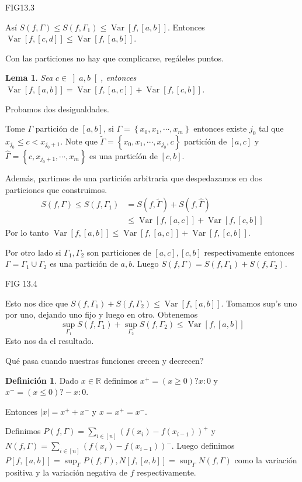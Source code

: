 \documentclass[12pt]{article}
\theoremstyle{plain}
\newtheorem{Lem}[Th]{Lema}             %
\theoremstyle{definition}
\newtheorem{Def}[Th]{Definición}       %
\theoremstyle{remark}
\numberwithin{equation}{section}
\DeclareMathOperator{\Var}{Var}     %
\newcommand{\bR}{\mathbb{R}}        %
\renewcommand{\geq}{\geqslant}      %
\renewcommand{\leq}{\leqslant}      %
\renewcommand{\:}{\colon}           %
\newcommand{\conj}[1]{\left\lbrace#1\right\rbrace}
\newcommand{\bonj}[1]{\left\lbrack#1\right\rbrack}
\newcommand{\obonj}[1]{\left\rbrack#1\right\lbrack}
\begin{document}
\begin{multicols}{2}
FIG13.3\par
Así $S(f,\Gamma)\leq S(f,\Gamma_1)\leq\Var\bonj{f,\bonj{a,b}}$. Entonces $\Var\bonj{f,\bonj{c,d}}\leq\Var\bonj{f,\bonj{a,b}}$.\par
Con las particiones no hay que complicarse, regáleles puntos.
\begin{Lem}\label{lem:variacionSepara}
  Sea $c\in\obonj{a,b}$, entonces $\Var\bonj{f,\bonj{a,b}}=\Var\bonj{f,\bonj{a,c}}+\Var\bonj{f,\bonj{c,b}}$.
\end{Lem}
\begin{ptcbp}
Probamos dos desigualdades.\par
Tome $\Gamma$ partición de $\bonj{a,b}$, si $\Gamma=\conj{x_0,x_1,\cdots,x_m}$ entonces existe $j_0$ tal que $x_{j_0}\leq c<x_{j_{0}+1}$. Note que $\tilde{\Gamma}=\conj{x_0,x_1,\cdots,x_{j_0},c}$ particíón de $\bonj{a,c}$ y $\widehat{\Gamma}=\conj{c,x_{j_0+1},\cdots,x_m}$ es una particíón de $\bonj{c,b}$.\par
Además, partimos de una partición arbitraria que despedazamos en dos particiones que construimos.
\begin{align*}
 S(f,\Gamma)\leq S(f,\Gamma_1) &=S(f,\tilde{\Gamma})+S(f,\widehat{\Gamma})  \\
   &\leq\Var\bonj{f,\bonj{a,c}}+\Var\bonj{f,\bonj{c,b}}
\end{align*}
Por lo tanto $\Var\bonj{f,\bonj{a,b}}\leq\Var\bonj{f,\bonj{a,c}}+\Var\bonj{f,\bonj{c,b}}$.\par
Por otro lado si $\Gamma_1,\Gamma_2$ son particiones de $\bonj{a,c},\bonj{c,b}$ respectivamente entonces $\Gamma=\Gamma_1\cup\Gamma_2$ es una partición de $a,b$. Luego $S(f,\Gamma)=S(f,\Gamma_1)+S(f,\Gamma_2)$. \par
FIG 13.4\par
Esto nos dice que $S(f,\Gamma_1)+S(f,\Gamma_2)\leq\Var\bonj{f,\bonj{a,b}}$. Tomamos sup's uno por uno, dejando uno fijo y luego en otro. Obtenemos
$$\sup_{\Gamma_1}S(f,\Gamma_1)+\sup_{\Gamma_2}S(f,\Gamma_2)\leq\Var\bonj{f,\bonj{a,b}}$$
Esto nos da el resultado.
\end{ptcbp}

Qué pasa cuando nuestras funciones crecen y decrecen?
\begin{Def}
  Dado $x\in\bR$ definimos $x^+=(x\geq 0)?x\colon 0$ y $x^-=(x\leq 0)?-x\colon 0$. \par
  Entonces $|x|=x^++x^-$ y $x=x^+=x^-$.\par
  Definimos $P(f,\Gamma)=\sum_{i\in\bonj{n}}(f(x_i)-f(x_{i-1}))^+$ y $N(f,\Gamma)=\sum_{i\in\bonj{n}}(f(x_i)-f(x_{i-1}))^-$. Luego definimos $P\bonj{f,\bonj{a,b}}=\sup_\Gamma P(f,\Gamma),N\bonj{f,\bonj{a,b}}=\sup_\Gamma N(f,\Gamma)$ como la variación positiva y la variación negativa de $f$ respectivamente.
\end{Def}


\end{multicols}
\end{document}
